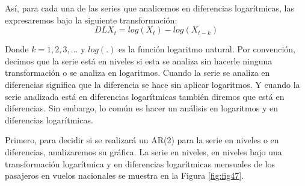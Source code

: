 \documentclass[
]{book}
\begin{document}
Así, para cada una de las series que analicemos en diferencias logarítmicas, las expresaremos bajo la siguiente transformación:
\begin{equation*}
    DLX_t = log(X_t) - log(X_{t-k})
\end{equation*}

Donde \(k = 1, 2, 3, \ldots\) y \(log(.)\) es la función logaritmo natural. Por convención, decimos que la serie está en niveles si esta se analiza sin hacerle ninguna transformación o se analiza en logaritmos. Cuando la serie se analiza en diferencias significa que la diferencia se hace sin aplicar logaritmos. Y cuando la serie analizada está en diferencias logarítmicas también diremos que está en diferencias. Sin embargo, lo común es hacer un análisis en logaritmos y en diferencias logarítmicas.

Primero, para decidir si se realizará un AR(2) para la serie en niveles o en diferencias, analizaremos su gráfica. La serie en niveles, en niveles bajo una transformación logarítmica y en diferencias logarítmicas mensuales de los pasajeros en vuelos nacionales se muestra en la Figura \ref{fig:fig47}.
\end{document}
